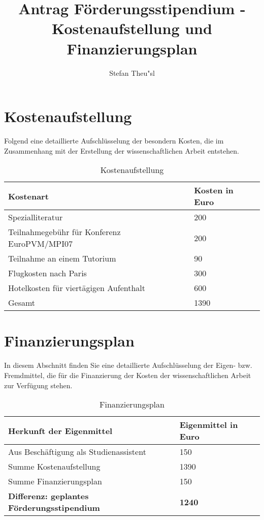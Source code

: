 \documentclass[a4paper,fleqn]{article}
\title{Antrag F\"orderungsstipendium - Kostenaufstellung und Finanzierungsplan}
\author{Stefan Theu"sl\inst{1}}
\institute{Matrikelnummer: 0352689\\
  Studienzweig: ManagementScience \\
\email{h0352689@wu-wien.ac.at}
}
\begin{document}
\maketitle

\section{Kostenaufstellung}

Folgend eine detaillierte Aufschl\"usselung der besondern Kosten, die
im Zusammenhang mit der Erstellung der wissenschaftlichen Arbeit
entstehen.

\begin{table}[ht]
  \centering
  \caption{Kostenaufstellung}
  \label{table:Kostenaufstellung}
  \begin{tabular}{|l|l|}
    \hline
    Kostenart                              & Kosten in Euro \\
    \hline
    Spezialliteratur                                & 200  \\
    Teilnahmegeb\"uhr f\"ur Konferenz EuroPVM/MPI07 & 200  \\
    Teilnahme an einem Tutorium                     &  90  \\
    Flugkosten nach Paris                           & 300  \\
    Hotelkosten f\"ur viert\"agigen Aufenthalt      & 600  \\
    \hline
    Gesamt                                          &1390  \\  
    \hline
  \end{tabular}
\end{table}


\section{Finanzierungsplan}

In diesem Abschnitt finden Sie eine detaillierte Aufschl\"usselung der
Eigen- bzw. Fremdmittel, die f\"ur die Finanzierung der Kosten der
wissenschaftlichen Arbeit zur Verf\"ugung stehen.

\begin{table}[ht]
  \centering
  \caption{Finanzierungsplan}
  \label{table:Finanzierungsplan}
  \begin{tabular}{|l|l|}
    \hline
    Herkunft der Eigenmittel         & Eigenmittel in Euro \\
    \hline
    Aus Besch\"aftigung als Studienassistent        & 150  \\
    \hline
    \hline
    Summe Kostenaufstellung                         &1390  \\
    Summe Finanzierungsplan                         & 150  \\
    \hline
    \textbf{Differenz: geplantes F\"orderungsstipendium}&\textbf{1240}\\
    \hline
  \end{tabular}
\end{table}
\end{document}
